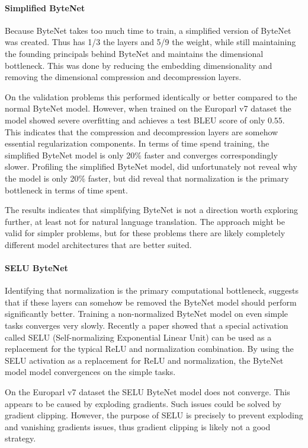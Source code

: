 \paragraph{Simplified ByteNet} Because ByteNet takes too much time to train, a simplified version of ByteNet was created. Thus has 1/3 the layers and 5/9 the weight, while still maintaining the founding principals behind ByteNet and maintains the dimensional bottleneck. This was done by reducing the embedding dimensionality and removing the dimensional compression and decompression layers.

On the validation problems this performed identically or better compared to the normal ByteNet model. However, when trained on the Europarl v7 dataset the model showed severe overfitting and achieves a test BLEU score of only $0.55$. This indicates that the compression and decompression layers are somehow essential regularization components. In terms of time spend training, the simplified ByteNet model is only 20\% faster and converges correspondingly slower. Profiling the simplified ByteNet model, did unfortunately not reveal why the model is only 20\% faster, but did reveal that normalization is the primary bottleneck in terms of time spent.

The results indicates that simplifying ByteNet is not a direction worth exploring further, at least not for natural language translation. The approach might be valid for simpler problems, but for these problems there are likely completely different model architectures that are better suited.

\paragraph{SELU ByteNet} Identifying that normalization is the primary computational bottleneck, suggests that if these layers can somehow be removed the ByteNet model should perform significantly better. Training a non-normalized ByteNet model on even simple tasks converges very slowly. Recently a paper showed that a special activation called SELU (Self-normalizing Exponential Linear Unit) can be used as a replacement for the typical ReLU and normalization combination. By using the SELU activation as a replacement for ReLU and normalization, the ByteNet model model convergences on the simple tasks.

On the Europarl v7 dataset the SELU ByteNet model does not converge. This appears to be caused by exploding gradients. Such issues could be solved by gradient clipping. However, the purpose of SELU is precisely to prevent exploding and vanishing gradients issues, thus gradient clipping is likely not a good strategy.

